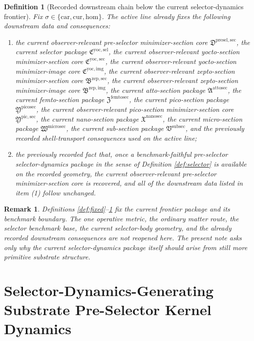 \documentclass[11pt]{article}
\newcommand{\Car}{\mathrm{car}}
\newcommand{\Cur}{\mathrm{cur}}
\newcommand{\Hom}{\mathrm{hom}}
\newcommand{\SubSectionPackage}{\mathfrak V^{\mathrm{subsec}}}
\newcommand{\MicroSectionPackage}{\mathfrak W^{\mathrm{microsec}}}
\newcommand{\NanoSectionPackage}{\mathfrak X^{\mathrm{nanosec}}}
\newcommand{\PicoSectionPackage}{\mathfrak Y^{\mathrm{picosec}}}
\newcommand{\PicoMinSectionCore}{\mathfrak Y^{\mathrm{pic,sec}}}
\newcommand{\FemtoSectionPackage}{\mathfrak Z^{\mathrm{femtosec}}}
\newcommand{\AttoSectionPackage}{\mathfrak A^{\mathrm{attosec}}}
\newcommand{\ZeptoImageCore}{\mathfrak B^{\mathrm{zep,img}}}
\newcommand{\ZeptoMinSectionCore}{\mathfrak B^{\mathrm{zep,sec}}}
\newcommand{\YoctoImageCore}{\mathfrak C^{\mathrm{yoc,img}}}
\newcommand{\YoctoMinSectionCore}{\mathfrak C^{\mathrm{yoc,sec}}}
\newcommand{\YoctoSelectorPackage}{\mathfrak C^{\mathrm{yoc,sel}}}
\newcommand{\PreSelectorMinSectionCore}{\mathfrak D^{\mathrm{presel,sec}}}
\newtheorem{definition}{Definition}
\newtheorem{remark}{Remark}
\begin{document}
\begin{definition}[Recorded downstream chain below the current selector-dynamics frontier]
\label{def:downstream}
Fix \(\sigma\in\{\Car,\Cur,\Hom\}\). The active line already fixes the following downstream data and consequences:
\begin{enumerate}
    \item the current observer-relevant pre-selector minimizer-section core \(\PreSelectorMinSectionCore\), the current selector package \(\YoctoSelectorPackage\), the current observer-relevant yocto-section minimizer-section core \(\YoctoMinSectionCore\), the current observer-relevant yocto-section minimizer-image core \(\YoctoImageCore\), the current observer-relevant zepto-section minimizer-section core \(\ZeptoMinSectionCore\), the current observer-relevant zepto-section minimizer-image core \(\ZeptoImageCore\), the current atto-section package \(\AttoSectionPackage\), the current femto-section package \(\FemtoSectionPackage\), the current pico-section package \(\PicoSectionPackage\), the current observer-relevant pico-section minimizer-section core \(\PicoMinSectionCore\), the current nano-section package \(\NanoSectionPackage\), the current micro-section package \(\MicroSectionPackage\), the current sub-section package \(\SubSectionPackage\), and the previously recorded shell-transport consequences used on the active line;
    \item the previously recorded fact that, once a benchmark-faithful pre-selector selector-dynamics package in the sense of Definition \ref{def:selector} is available on the recorded geometry, the current observer-relevant pre-selector minimizer-section core is recovered, and all of the downstream data listed in item (1) follow unchanged.
\end{enumerate}
\end{definition}

\begin{remark}
Definitions \ref{def:fixed}--\ref{def:downstream} fix the current frontier package and its benchmark boundary. The one operative metric, the ordinary matter route, the selector benchmark base, the current selector-body geometry, and the already recorded downstream consequences are not reopened here. The present note asks only why the current selector-dynamics package itself should arise from still more primitive substrate structure.
\end{remark}

\section{Selector-Dynamics-Generating Substrate Pre-Selector Kernel Dynamics}
\end{document}

